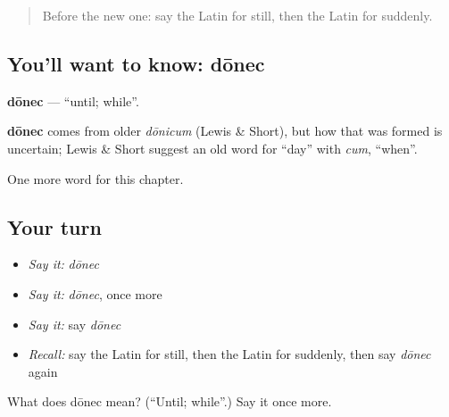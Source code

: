 \begin{quote}
Before the new one: say the Latin for still, then the Latin for suddenly.
\end{quote}

\subsection*{You'll want to know: dōnec}
\textbf{dōnec} — \textquotedblleft{}until; while\textquotedblright{}.

\begin{cousinweb}
\textbf{dōnec} comes from older \emph{dōnicum} (Lewis \& Short), but how that was formed is uncertain; Lewis \& Short suggest an old word for \textquotedblleft{}day\textquotedblright{} with \emph{cum}, \textquotedblleft{}when\textquotedblright{}.
\end{cousinweb}

\begin{grammarlens}[title={What you've built}]
One more word for this chapter.
\end{grammarlens}

\subsection*{Your turn}
\begin{itemize}
\raggedright
  \item \emph{Say it:} \emph{dōnec}
  \item \emph{Say it:} \emph{dōnec}, once more
  \item \emph{Say it:} say \emph{dōnec}
  \item \emph{Recall:} say the Latin for still, then the Latin for suddenly, then say \emph{dōnec} again
\end{itemize}

\begin{tcolorbox}[breakable,colback=teal!4,colframe=teal!35!black,title={Before you move on}]
What does dōnec mean? (\textquotedblleft{}Until; while\textquotedblright{}.) Say it once more.
\end{tcolorbox}
